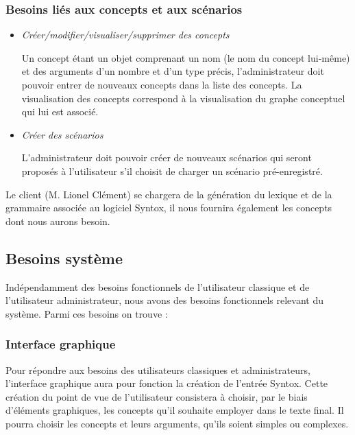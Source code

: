 \documentclass[12pt]{report}
\begin{document}
\subsubsection{Besoins liés aux concepts et aux scénarios}

\begin{itemize}
\item \emph{Créer/modifier/visualiser/supprimer des concepts}

	Un concept étant un objet comprenant un nom (le nom du concept lui-même) et des arguments d'un nombre et d'un type précis, l'administrateur doit pouvoir entrer de nouveaux concepts dans la liste des concepts.
	La visualisation des concepts correspond à la visualisation du graphe conceptuel qui lui est associé.
	
\item \emph{Créer des scénarios}

	L'administrateur doit pouvoir créer de nouveaux scénarios qui seront proposés à l'utilisateur s'il choisit de charger un scénario pré-enregistré.
	
\end{itemize}


Le client (M. Lionel Clément) se chargera de la génération du lexique et de la grammaire associée au logiciel Syntox, il nous fournira également les concepts dont nous aurons besoin.

\subsection{Besoins système}

Indépendamment des besoins fonctionnels de l'utilisateur classique et de l'utilisateur administrateur, nous avons des besoins fonctionnels relevant du système. Parmi ces besoins on trouve :

\subsubsection{Interface graphique}

Pour répondre aux besoins des utilisateurs classiques et administrateurs, l'interface graphique aura pour fonction la création de l'entrée Syntox. Cette création du point de vue de l'utilisateur consistera à choisir, par le biais d'éléments graphiques, les concepts qu'il souhaite employer dans le texte final. Il pourra choisir les concepts et leurs arguments, qu'ils soient simples ou complexes.

\bigskip
\end{document}
